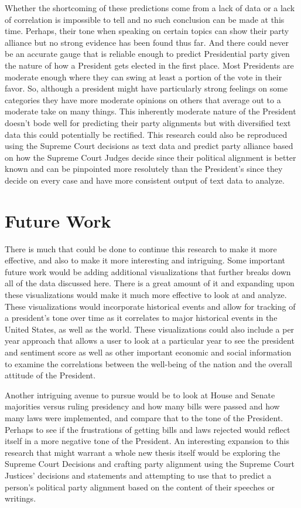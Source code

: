 Whether the shortcoming of these predictions come from a lack of data or a lack of correlation is impossible to tell and no such conclusion can be made at this time.
Perhaps, their tone when speaking on certain topics can show their party alliance but no strong evidence has been found thus far.
And there could never be an accurate gauge that is reliable enough to predict Presidential party given the nature of how a President gets elected in the first place.
Most Presidents are moderate enough where they can swing at least a portion of the vote in their favor.
So, although a president might have particularly strong feelings on some categories they have more moderate opinions on others that average out to a moderate take on many things.
This inherently moderate nature of the President doesn't bode well for predicting their party alignments but with diversified text data this could potentially be rectified.
This research could also be reproduced using the Supreme Court decisions as text data and predict party alliance based on how the Supreme Court Judges decide since their political alignment is better known and can be pinpointed more resolutely than the President's since they decide on every case and have more consistent output of text data to analyze.

\section{Future Work}
There is much that could be done to continue this research to make it more effective, and also to make it more interesting and intriguing.
Some important future work would be adding additional visualizations that further breaks down all of the data discussed here.
There is a great amount of it and expanding upon these visualizations would make it much more effective to look at and analyze.
These visualizations would incorporate historical events and allow for tracking of a president's tone over time as it correlates to major historical events in the United States, as well as the world.
These visualizations could also include a per year approach that allows a user to look at a particular year to see the president and sentiment score as well as other important economic and social information to examine the correlations between the well-being of the nation and the overall attitude of the President.

Another intriguing avenue to pursue would be to look at House and Senate majorities versus ruling presidency and how many bills were passed and how many laws were implemented, and compare that to the tone of the President.
Perhaps to see if the frustrations of getting bills and laws rejected would reflect itself in a more negative tone of the President.
An interesting expansion to this research that might warrant a whole new thesis itself would be exploring the Supreme Court Decisions and crafting party alignment using the Supreme Court Justices' decisions and statements and attempting to use that to predict a person's political party alignment based on the content of their speeches or writings.

